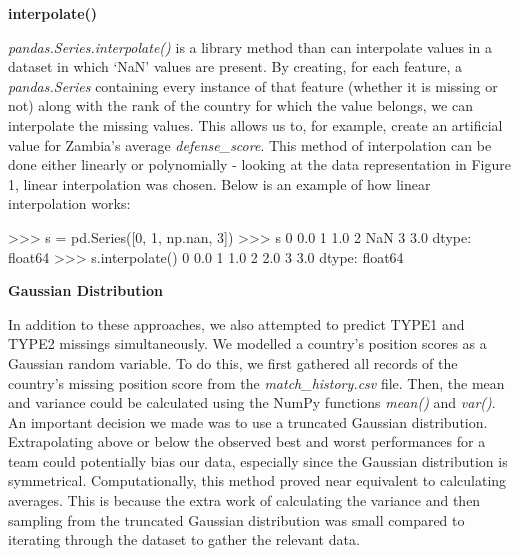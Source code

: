 \documentclass[8pt]{article}
\begin{document}
\textbf{interpolate()}\vspace{0.05cm}

\textit{pandas.Series.interpolate()} \cite{interpolate} is a library method than can interpolate values in a dataset in which `NaN' values are present. By creating, for each feature, a \textit{pandas.Series} containing every instance of that feature (whether it is missing or not) along with the rank of the country for which the value belongs, we can interpolate the missing values. This allows us to, for example, create an artificial value for Zambia's average \textit{defense\_score}. This method of interpolation can be done either linearly or polynomially - looking at the data representation in Figure 1, linear interpolation was chosen. Below is an example of how linear interpolation works:

\tiny{
\begin{python}
    >>> s = pd.Series([0, 1, np.nan, 3])
    >>> s
    0    0.0
    1    1.0
    2    NaN
    3    3.0
    dtype: float64
    >>> s.interpolate()
    0    0.0
    1    1.0
    2    2.0
    3    3.0
    dtype: float64
\end{python}
}
\small

\textbf{Gaussian Distribution}\vspace{0.05cm}

In addition to these approaches, we also attempted to predict TYPE1 and TYPE2 missings simultaneously. We modelled a country's position scores as a Gaussian random variable. To do this, we first gathered all records of the country's missing position score from the \textit{match\_history.csv} file. Then, the mean and variance could be calculated using the NumPy functions \textit{mean()} and \textit{var()}. An important decision we made was to use a truncated Gaussian distribution. Extrapolating above or below the observed best and worst performances for a team could potentially bias our data, especially since the Gaussian distribution is symmetrical.
Computationally, this method proved near equivalent to calculating averages. This is because the extra work of calculating the variance and then sampling from the truncated Gaussian distribution was small compared to iterating through the dataset to gather the relevant data.
\end{document}
